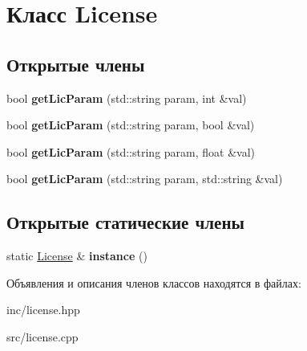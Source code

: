 \hypertarget{classLicense}{}\section{Класс License}
\label{classLicense}
\subsection*{Открытые члены}
\begin{DoxyCompactItemize}
\item 
\mbox{\label{classLicense_a0f1601563f3c2dd2f32a7aea30ce98f6}} 
bool {\bfseries get\+Lic\+Param} (std\+::string param, int \&val)
\item 
\mbox{\label{classLicense_af8ef54ae197f11de77280bb01693afaa}} 
bool {\bfseries get\+Lic\+Param} (std\+::string param, bool \&val)
\item 
\mbox{\label{classLicense_af25939806b0a914d01ec85cfbf24ec24}} 
bool {\bfseries get\+Lic\+Param} (std\+::string param, float \&val)
\item 
\mbox{\label{classLicense_a0877813f64835a58b621423a262a9dd0}} 
bool {\bfseries get\+Lic\+Param} (std\+::string param, std\+::string \&val)
\end{DoxyCompactItemize}
\subsection*{Открытые статические члены}
\begin{DoxyCompactItemize}
\item 
\mbox{\label{classLicense_a37cc2176d11d582e2302058b2eb99425}} 
static \hyperlink{classLicense}{License} \& {\bfseries instance} ()
\end{DoxyCompactItemize}


Объявления и описания членов классов находятся в файлах\+:\begin{DoxyCompactItemize}
\item 
inc/license.\+hpp\item 
src/license.\+cpp\end{DoxyCompactItemize}
